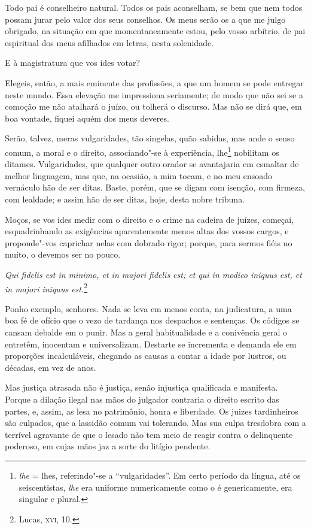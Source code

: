 Todo pai é conselheiro natural. Todos os pais aconselham, se bem
que nem todos possam jurar pelo valor dos seus conselhos. Os meus serão
os a que me julgo obrigado, na situação em que momentaneamente estou,
pelo vosso arbítrio, de pai espiritual dos meus afilhados em letras,
nesta solenidade.

E à magistratura que vos ides votar?

Elegeis, então, a mais eminente das profissões, a que um homem se
pode entregar neste mundo. Essa elevação me impressiona seriamente; de
modo que não sei se a comoção me não atalhará o juízo, ou tolherá o
discurso. Mas não se dirá que, em boa vontade, fiquei aquém dos meus deveres.

Serão, talvez, meras vulgaridades, tão singelas, quão sabidas, mas
ande o senso comum, a moral e o direito, associando"-se à experiência,
lhe\footnote{  \textit{lhe} = lhes, referindo"-se a “vulgaridades”.  Em
certo período da língua, até os seiscentistas, \textit{lhe} era uniforme
numericamente como o é genericamente, era singular e plural.}
nobilitam os ditames. Vulgaridades, que qualquer outro orador se
avantajaria em esmaltar de melhor linguagem, mas que, na ocasião, a mim
tocam, e no meu ensoado vernáculo hão de ser ditas. Baste, porém, que
se digam com isenção, com firmeza, com lealdade; e assim hão de ser
ditas, hoje, desta nobre tribuna.

Moços, se vos ides medir com o direito e o crime na cadeira de
juízes, começai, esquadrinhando as exigências aparentemente menos altas
dos vossos cargos, e proponde"-vos caprichar nelas com dobrado rigor;
porque, para sermos fiéis no muito, o devemos ser no pouco.

\textit{Qui fidelis est in minimo, et in majori fidelis est; et
qui in modico iniquus est, et in majori iniquus
est.}\footnote{ Lucas, \textsc{xvi}, 10.} 

Ponho exemplo, senhores. Nada se leva em menos conta, na
judicatura, a uma boa fé de ofício que o vezo de tardança nos despachos
e sentenças. Os códigos se cansam debalde em o punir. Mas a geral
habitualidade e a conivência geral o entretêm, inocentam e
universalizam. Destarte se incrementa e demanda ele em proporções
incalculáveis, chegando as causas a contar a idade por lustros, ou
décadas, em vez de anos.

Mas justiça atrasada não é justiça, senão injustiça qualificada e
manifesta. Porque a dilação ilegal nas mãos do julgador contraria o
direito escrito das partes, e, assim, as lesa no patrimônio, honra e
liberdade. Os juizes tardinheiros são culpados, que a lassidão comum
vai tolerando. Mas sua culpa tresdobra com a terrível agravante de que
o lesado não tem meio de reagir contra o delinquente poderoso, em cujas
mãos jaz a sorte do litígio pendente.

